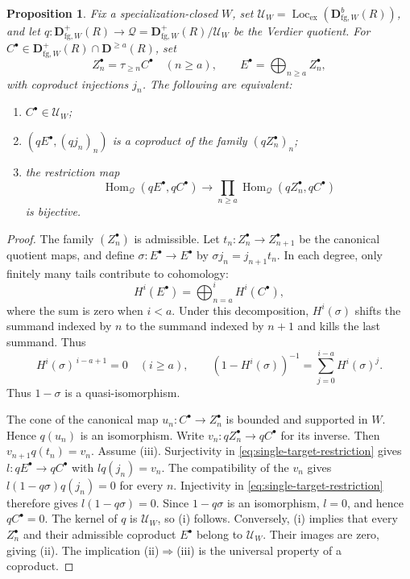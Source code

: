 \documentclass[11pt]{amsart}
\numberwithin{equation}{section}
\newtheorem{proposition}[theorem]{Proposition}
\theoremstyle{definition}
\theoremstyle{remark}
\DeclareMathOperator{\Loc}{Loc}
\DeclareMathOperator{\Hom}{Hom}
\newcommand{\D}{\mathbf D}
\newcommand{\fg}{\mathrm{fg}}
\newcommand{\Lex}{\Loc_{\mathrm{ex}}}
\begin{document}
\begin{proposition}\label{prop:tail-obstruction}
Fix a specialization-closed $W$, set $\mathcal U_W=\Lex(\D^b_{\fg,W}(R))$, and
let $q:\D^+_{\fg,W}(R)\to\mathcal Q=\D^+_{\fg,W}(R)/\mathcal U_W$ be the Verdier quotient.
For $C^{\bullet}\in\D^+_{\fg,W}(R)\cap\D^{\geq a}(R)$, set
\[
 Z_n^{\bullet}=\tau_{\geq n}C^{\bullet}\quad(n\geq a),\qquad E^{\bullet}=\bigoplus_{n\geq a}Z_n^{\bullet},
\]
with coproduct injections $j_n$. The following are equivalent:
\begin{enumerate}[label=(\roman*),leftmargin=*]
\item $C^{\bullet}\in\mathcal U_W$;
\item $(qE^{\bullet},(qj_n)_n)$ is a coproduct of the family $(qZ_n^{\bullet})_n$;
\item the restriction map
\begin{equation}\label{eq:single-target-restriction}
 \Hom_{\mathcal Q}(qE^{\bullet},qC^{\bullet})\longrightarrow
 \prod_{n\geq a}\Hom_{\mathcal Q}(qZ_n^{\bullet},qC^{\bullet})
\end{equation}
is bijective.
\end{enumerate}
\end{proposition}
\begin{proof}
The family $(Z_n^{\bullet})$ is admissible. Let
$t_n:Z_n^{\bullet}\to Z_{n+1}^{\bullet}$ be the canonical quotient
maps, and define $\sigma:E^{\bullet}\to E^{\bullet}$ by
$\sigma j_n=j_{n+1}t_n$. In each degree, only finitely many tails
contribute to cohomology:
\[
 H^i(E^{\bullet})
 =\bigoplus_{n=a}^{i}H^i(C^{\bullet}),
\]
where the sum is zero when $i<a$. Under this decomposition,
$H^i(\sigma)$ shifts the summand indexed by $n$ to the summand
indexed by $n+1$ and kills the last summand. Thus
\[
 H^i(\sigma)^{\,i-a+1}=0\quad(i\geq a),\qquad
 (1-H^i(\sigma))^{-1}
 =\sum_{j=0}^{i-a}H^i(\sigma)^j.
\]
Thus $1-\sigma$ is a quasi-isomorphism.

The cone of the canonical map $u_n:C^{\bullet}\to Z_n^{\bullet}$
is bounded and supported in $W$. Hence $q(u_n)$ is an isomorphism.
Write $v_n:qZ_n^{\bullet}\to qC^{\bullet}$ for its inverse. Then
$v_{n+1}q(t_n)=v_n$.
Assume (iii). Surjectivity in \eqref{eq:single-target-restriction}
gives $l:qE^{\bullet}\to qC^{\bullet}$ with $lq(j_n)=v_n$.
The compatibility of the $v_n$ gives $l(1-q\sigma)q(j_n)=0$
for every $n$. Injectivity in \eqref{eq:single-target-restriction}
therefore gives $l(1-q\sigma)=0$.
Since $1-q\sigma$ is an isomorphism, $l=0$, and hence $qC^{\bullet}=0$.
The kernel of $q$ is $\mathcal U_W$, so (i) follows.
Conversely, (i) implies that every $Z_n^{\bullet}$ and their
admissible coproduct $E^{\bullet}$ belong to $\mathcal U_W$.
Their images are zero, giving (ii). The implication
(ii)$\Rightarrow$(iii) is the universal property of a coproduct.
\end{proof}
\end{document}
